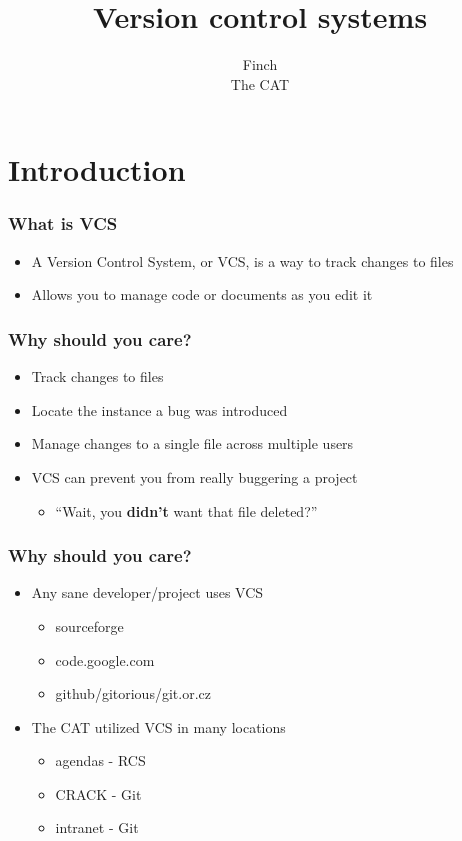 \documentclass{beamer}
\title{Version control systems}
\author{Finch \\
    The CAT
}
\begin{document}
\begin{frame}
    \titlepage
\end{frame}

\section{Introduction}

\begin{frame}
    \frametitle{What is VCS}
    \begin{itemize}
	\item A Version Control System, or VCS, is a way to track changes to files
	\item Allows you to manage code or documents as you edit it
    \end{itemize}
\end{frame}

\begin{frame}
    \frametitle{Why should you care?}
    \begin{itemize}
	\item Track changes to files
	\item Locate the instance a bug was introduced
	\item Manage changes to a single file across multiple users
	\item VCS can prevent you from really buggering a project
	\begin{itemize}
	    \item ``Wait, you {\bf didn't} want that file deleted?''
	\end{itemize}
    \end{itemize}
\end{frame}

\begin{frame}
    \frametitle{Why should you care?}
    \begin{itemize}
	\item Any sane developer/project uses VCS
	\begin{itemize}
	    \item sourceforge
	    \item code.google.com
	    \item github/gitorious/git.or.cz
	\end{itemize}
	\item The CAT utilized VCS in many locations
	\begin{itemize}
	    \item agendas - RCS
	    \item CRACK - Git
	    \item intranet - Git
	\end{itemize}
    \end{itemize}
\end{frame}
\end{document}

